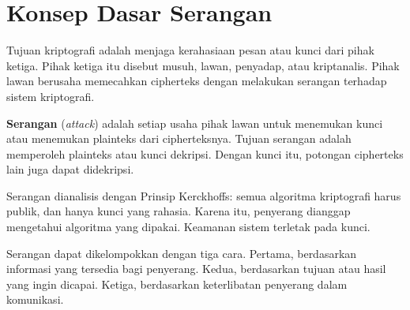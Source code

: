 \section{Konsep Dasar Serangan}
\label{sec:konsep-serangan}

Tujuan kriptografi adalah menjaga kerahasiaan pesan atau kunci dari pihak ketiga.
Pihak ketiga itu disebut musuh, lawan, penyadap, atau kriptanalis. Pihak lawan
berusaha memecahkan cipherteks dengan melakukan serangan terhadap sistem
kriptografi.

\textbf{Serangan} (\textit{attack}) adalah setiap usaha pihak lawan untuk
menemukan kunci atau menemukan plainteks dari cipherteksnya. Tujuan serangan
adalah memperoleh plainteks atau kunci dekripsi. Dengan kunci itu, potongan
cipherteks lain juga dapat didekripsi.

Serangan dianalisis dengan Prinsip Kerckhoffs: semua algoritma kriptografi harus
publik, dan hanya kunci yang rahasia. Karena itu, penyerang dianggap mengetahui
algoritma yang dipakai. Keamanan sistem terletak pada kunci.

Serangan dapat dikelompokkan dengan tiga cara. Pertama, berdasarkan informasi
yang tersedia bagi penyerang. Kedua, berdasarkan tujuan atau hasil yang ingin
dicapai. Ketiga, berdasarkan keterlibatan penyerang dalam komunikasi.
